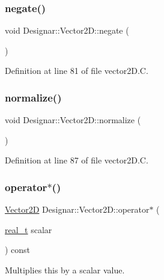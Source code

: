 \subsubsection{\texorpdfstring{negate()}{negate()}}
{\footnotesize\ttfamily void Designar\+::\+Vector2\+D\+::negate (\begin{DoxyParamCaption}{ }\end{DoxyParamCaption})}



Definition at line 81 of file vector2\+D.\+C.

\mbox{\label{class_designar_1_1_vector2_d_ac504a8cec82e7183bd0105e83942fd67}} 
\subsubsection{\texorpdfstring{normalize()}{normalize()}}
{\footnotesize\ttfamily void Designar\+::\+Vector2\+D\+::normalize (\begin{DoxyParamCaption}{ }\end{DoxyParamCaption})}



Definition at line 87 of file vector2\+D.\+C.

\mbox{\label{class_designar_1_1_vector2_d_ad0e749363b81d3ec6eb87d7e7d378f63}} 
\subsubsection{\texorpdfstring{operator$\ast$()}{operator*()}\hspace{0.1cm}{\footnotesize\ttfamily [1/2]}}
{\footnotesize\ttfamily \hyperlink{class_designar_1_1_vector2_d}{Vector2D} Designar\+::\+Vector2\+D\+::operator$\ast$ (\begin{DoxyParamCaption}\item[{\hyperlink{namespace_designar_aca2c32af26808dbec1f3a3071fad25ce}{real\+\_\+t}}]{scalar }\end{DoxyParamCaption}) const}



Multiplies this by a scalar value. 



